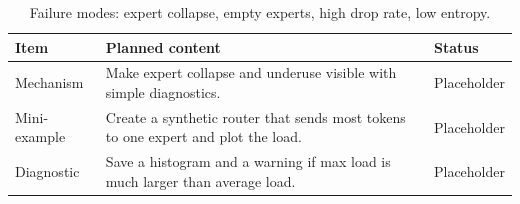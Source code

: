 \begin{table}[H]
\centering
\caption{Failure modes: expert collapse, empty experts, high drop rate, low entropy.}
\label{tab:ch04-load-histograms-and-failure-modes}
\begin{tabularx}{\textwidth}{p{}X p{}}
\toprule
Item & Planned content & Status \\
\midrule
Mechanism & Make expert collapse and underuse visible with simple diagnostics. & Placeholder \\
Mini-example & Create a synthetic router that sends most tokens to one expert and plot the load. & Placeholder \\
Diagnostic & Save a histogram and a warning if max load is much larger than average load. & Placeholder \\
\bottomrule
\end{tabularx}
\end{table}
